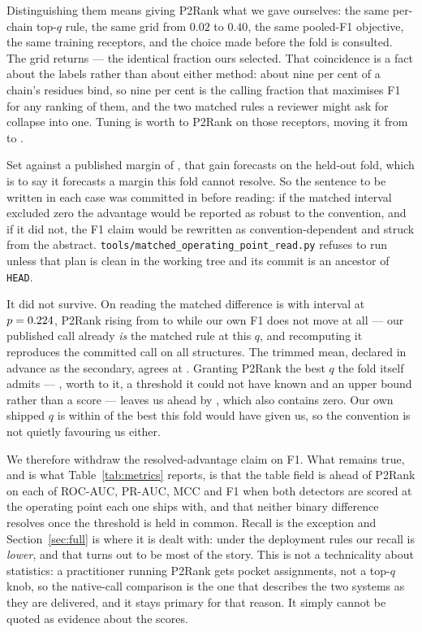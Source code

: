 \documentclass[11pt]{article}
\begin{document}
Distinguishing them means giving P2Rank what we gave ourselves: the same
per-chain top-\(q\) rule, the same grid from \(0.02\) to \(0.40\), the same
pooled-F1 objective, the same \PTwoTrainUnits{} training receptors, and the
choice made before the fold is consulted. The grid returns \MatchPTwoQ{} --- the
identical fraction ours selected. That coincidence is a fact about the labels
rather than about either method: about nine per cent of a chain's residues bind,
so nine per cent is the calling fraction that maximises F1 for any ranking of
them, and the two matched rules a reviewer might ask for collapse into one.
Tuning is worth \MatchTrainGain{} to P2Rank on those receptors, moving it from
\MatchPTwoTrainNative{} to \MatchPTwoTrainTuned{}.

Set against a published margin of \MatchNativeDelta{}, that gain forecasts
\MatchForecast{} on the held-out fold, which is to say it forecasts a margin
this fold cannot resolve. So the sentence to be written in each case was
committed in \MatchCommit{} before reading: if the matched interval excluded
zero the advantage would be reported as robust to the convention, and if it did
not, the F1 claim would be rewritten as convention-dependent and struck from the
abstract. \texttt{tools/matched\_operating\_point\_read.py} refuses to run
unless that plan is clean in the working tree and its commit is an ancestor of
\texttt{HEAD}.

It did not survive. On reading \MatchReadIndex{} the matched difference is
\MatchBDelta{} with interval \MatchBCI{} at \(p=0.224{}\), P2Rank rising from
\MatchNativePTwo{} to \MatchBPTwo{} while our own F1 does not move at all ---
our published call already \emph{is} the matched rule at this \(q\), and
recomputing it reproduces the committed call on all \MatchNUnits{} structures.
The trimmed mean, declared in advance as the secondary, agrees at \MatchBTrim{}
\MatchBTrimCI{}. Granting P2Rank the best \(q\) the fold itself admits ---
\MatchOracleQ{}, worth \MatchOraclePTwo{} to it, a threshold it could not have
known and an upper bound rather than a score --- leaves us ahead by
\MatchOracleDelta{} \MatchOracleCI{}, which also contains zero. Our own shipped
\(q\) is within \MatchOurOracleGap{} of the best this fold would have given us,
so the convention is not quietly favouring us either.

We therefore withdraw the resolved-advantage claim on F1. What remains true, and
is what Table~\ref{tab:metrics} reports, is that the table field is ahead of
P2Rank on each of ROC-AUC, PR-AUC, MCC and F1 when both detectors are scored at
the operating point each one ships with, and that neither binary difference
resolves once the threshold is held in common. Recall is the exception and
Section~\ref{sec:full} is where it is dealt with: under the deployment rules our
recall is \emph{lower}, and that turns out to be most of the story. This is not
a technicality about statistics: a
practitioner running P2Rank gets pocket assignments, not a top-\(q\) knob, so the
native-call comparison is the one that describes the two systems as they are
delivered, and it stays primary for that reason. It simply cannot be quoted as
evidence about the scores.
\end{document}

